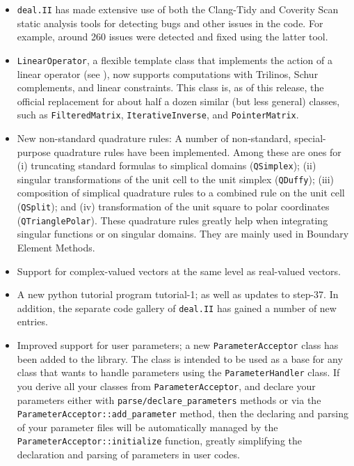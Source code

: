 \documentclass{ansarticle-preprint}
\newcommand{\specialword}[1]{\texttt{#1}}
\newcommand{\dealii}{{\specialword{deal.II}}\xspace}
\begin{document}
\begin{itemize}
\item \dealii has made extensive use of both the Clang-Tidy \cite{clang-tidy}
  and Coverity Scan \cite{coverity} static analysis tools for detecting bugs
  and other issues in the code. For example, around 260 issues were detected and
  fixed using the latter tool.

\item
  \texttt{LinearOperator}, a flexible template class that implements the action of a
  linear operator (see \cite{MaierBardelloniHeltai-2016-b}), now supports
  computations with Trilinos, Schur complements, and linear constraints. This
  class is, as of this release, the official replacement for about half a dozen
  similar (but less general) classes, such as \texttt{FilteredMatrix},
  \texttt{IterativeInverse}, and \texttt{PointerMatrix}.

\item New non-standard quadrature rules:
A number of non-standard, special-purpose quadrature rules have been
implemented. Among these are ones for
(i) truncating standard formulas to simplical domains (\texttt{QSimplex});
(ii) singular transformations of the unit cell to the unit simplex
    (\texttt{QDuffy});
(iii) composition of simplical quadrature rules to a combined rule on the
    unit cell (\texttt{QSplit});
and (iv) transformation of the unit square to polar coordinates
    (\texttt{QTrianglePolar}).
These quadrature rules greatly help when integrating singular
functions or on singular domains. They
are mainly used in Boundary Element Methods.


\item
  Support for complex-valued vectors at the same level as real-valued
  vectors.

\item A new python tutorial program tutorial-1; as well as
  updates to step-37. In addition, the separate code
  gallery of \dealii has gained a number of new entries.

\item Improved support for user parameters; a new \texttt{ParameterAcceptor}
  class has been added to the library. The class is intended to be used as a
  base for any class that wants to handle parameters using the
  \texttt{ParameterHandler} class. If you derive all your classes from
  \texttt{ParameterAcceptor}, and declare your parameters either with
  \texttt{parse/declare\_parameters} methods or via the
  \texttt{ParameterAcceptor::add\_parameter} method, then the declaring and
  parsing of your parameter files will be automatically managed by the
  \texttt{ParameterAcceptor::initialize} function, greatly simplifying
  the declaration and parsing of parameters in user codes.


\end{itemize}
\end{document}
